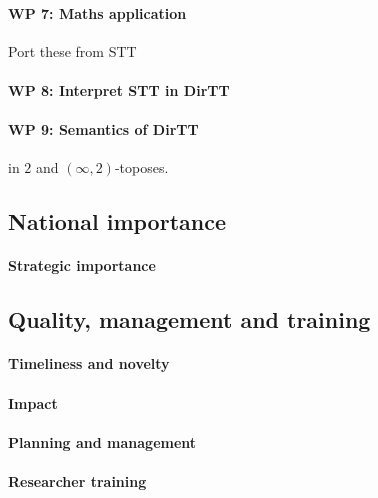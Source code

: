 \documentclass[a4paper,11pt]{article}
\begin{document}
\paragraph{WP 7: Maths application} Port these from STT

\paragraph{WP 8: Interpret STT in DirTT}

\paragraph{WP 9: Semantics of DirTT} in $2$ and $(\infty,2)$-toposes.

\subsection{National importance}

\paragraph{Strategic importance}

\subsection{Quality, management and training}

\paragraph{Timeliness and novelty}

\paragraph{Impact}

\paragraph{Planning and management}

\paragraph{Researcher training}

\nocite{*}

\printbibliography
\end{document}
